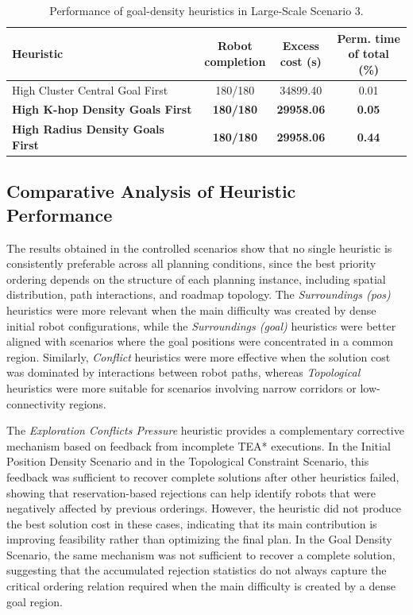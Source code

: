 \begin{table}[H]
\centering
\caption{Performance of goal-density heuristics in Large-Scale Scenario 3.}
\label{tab:large_scale_scene3_goal_heuristics}
\footnotesize
\setlength{\tabcolsep}{6pt}
\begin{tabular}{@{}lccc@{}}
\toprule
\textbf{Heuristic} &
\makecell{\textbf{Robot}\\\textbf{completion}} &
\makecell{\textbf{Excess}\\\textbf{cost (s)}} &
\makecell{\textbf{Perm. time}\\\textbf{of total (\%)}} \\
\midrule
High Cluster Central Goal First & 180/180 & 34899.40 & 0.01 \\
\textbf{High K-hop Density Goals First} & \textbf{180/180} & \textbf{29958.06} & \textbf{0.05} \\
\textbf{High Radius Density Goals First} & \textbf{180/180} & \textbf{29958.06} & \textbf{0.44} \\
\bottomrule
\end{tabular}
\end{table}



\subsection{Comparative Analysis of Heuristic Performance}
\label{subsec:overall_heuristic_analysis}
\hspace{\parindent}
The results obtained in the controlled scenarios show that no single heuristic is consistently
preferable across all planning conditions, since the best priority ordering depends on the structure
of each planning instance, including spatial distribution, path interactions, and roadmap topology.
The \textit{Surroundings (pos)} heuristics were more relevant when the main difficulty was created
by dense initial robot configurations, while the \textit{Surroundings (goal)} heuristics were better
aligned with scenarios where the goal positions were concentrated in a common region. Similarly,
\textit{Conflict} heuristics were more effective when the solution cost was dominated by interactions
between robot paths, whereas \textit{Topological} heuristics were more suitable for scenarios involving
narrow corridors or low-connectivity regions.

The \textit{Exploration Conflicts Pressure} heuristic provides a complementary corrective mechanism
based on feedback from incomplete TEA* executions. In the Initial Position Density Scenario and
in the Topological Constraint Scenario, this feedback was sufficient to recover complete solutions
after other heuristics failed, showing that reservation-based rejections can help identify robots that
were negatively affected by previous orderings. However, the heuristic did not produce the best
solution cost in these cases, indicating that its main contribution is improving feasibility rather
than optimizing the final plan. In the Goal Density Scenario, the same mechanism was not
sufficient to recover a complete solution, suggesting that the accumulated rejection statistics do
not always capture the critical ordering relation required when the main difficulty is created by a
dense goal region.

